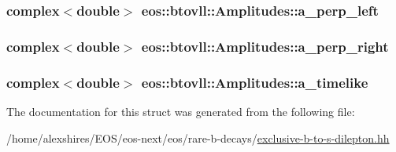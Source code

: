 \label{structeos_1_1btovll_1_1Amplitudes_aefccd00f09f49f4c3ae585d232786cfc}
\hypertarget{structeos_1_1btovll_1_1Amplitudes_a808710a7d0ed790976d1a5c9b960f6e5}{
\subsubsection[{a\_\-perp\_\-left}]{\setlength{\rightskip}{0pt plus 5cm}complex$<$double$>$ {\bf eos::btovll::Amplitudes::a\_\-perp\_\-left}}}
\label{structeos_1_1btovll_1_1Amplitudes_a808710a7d0ed790976d1a5c9b960f6e5}
\hypertarget{structeos_1_1btovll_1_1Amplitudes_a0eb4cfaf2543cea66fa1307abb5737a0}{
\subsubsection[{a\_\-perp\_\-right}]{\setlength{\rightskip}{0pt plus 5cm}complex$<$double$>$ {\bf eos::btovll::Amplitudes::a\_\-perp\_\-right}}}
\label{structeos_1_1btovll_1_1Amplitudes_a0eb4cfaf2543cea66fa1307abb5737a0}
\hypertarget{structeos_1_1btovll_1_1Amplitudes_aba7c6fa6629f6bac6651bd74cdc884fb}{
\subsubsection[{a\_\-timelike}]{\setlength{\rightskip}{0pt plus 5cm}complex$<$double$>$ {\bf eos::btovll::Amplitudes::a\_\-timelike}}}
\label{structeos_1_1btovll_1_1Amplitudes_aba7c6fa6629f6bac6651bd74cdc884fb}


The documentation for this struct was generated from the following file:\begin{DoxyCompactItemize}
\item 
/home/alexshires/EOS/eos-\/next/eos/rare-\/b-\/decays/\hyperlink{exclusive-b-to-s-dilepton_8hh}{exclusive-\/b-\/to-\/s-\/dilepton.hh}\end{DoxyCompactItemize}
